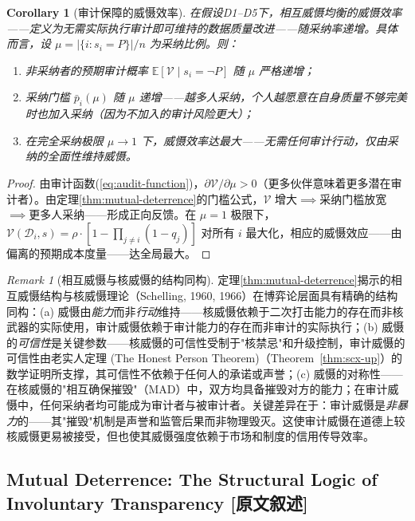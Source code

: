 \documentclass[12pt,a4paper]{ctexart}
\newtheorem{corollary}[theorem]{Corollary}
\theoremstyle{definition}
\theoremstyle{remark}
\newtheorem{remark}{Remark}[section]
\begin{document}
\begin{corollary}[审计保障的威慑效率]
\label{cor:deterrence-efficiency}
在假设D1--D5下，相互威慑均衡的威慑效率——定义为无需实际执行审计即可维持的数据质量改进——随采纳率递增。具体而言，设 $\mu = |\{i: s_i = P\}| / n$ 为采纳比例。则：
\begin{enumerate}[label=(\roman*)]
\item 非采纳者的预期审计概率 $\mathbb{E}[\mathcal{V} \mid s_i = \neg P]$ 随 $\mu$ 严格递增；
\item 采纳门槛 $\bar{p}_i(\mu)$ 随 $\mu$ 递增——越多人采纳，个人越愿意在自身质量不够完美时也加入采纳（因为不加入的审计风险更大）；
\item 在完全采纳极限 $\mu \to 1$ 下，威慑效率达最大——无需任何审计行动，仅由采纳的全面性维持威慑。
\end{enumerate}
\end{corollary}

\begin{proof}
由审计函数(\ref{eq:audit-function})，$\partial \mathcal{V} / \partial \mu > 0$（更多伙伴意味着更多潜在审计者）。由定理\ref{thm:mutual-deterrence}的门槛公式，$\mathcal{V}$ 增大$\implies$采纳门槛放宽$\implies$更多人采纳——形成正向反馈。在 $\mu = 1$ 极限下，$\mathcal{V}(\mathcal{D}_i, s) = \rho \cdot [1 - \prod_{j \neq i} (1 - q_j)]$ 对所有 $i$ 最大化，相应的威慑效应——由偏离的预期成本度量——达全局最大。
\end{proof}

\begin{remark}[相互威慑与核威慑的结构同构]
定理\ref{thm:mutual-deterrence}揭示的相互威慑结构与核威慑理论（Schelling, 1960, 1966）在博弈论层面具有精确的结构同构：(a) 威慑由\textit{能力}而非\textit{行动}维持——核威慑依赖于二次打击能力的存在而非核武器的实际使用，审计威慑依赖于审计能力的存在而非审计的实际执行；(b) 威慑的\textit{可信性}是关键参数——核威慑的可信性受制于"核禁忌"和升级控制，审计威慑的可信性由老实人定理 (The Honest Person Theorem)（Theorem~\ref{thm:scx-up}）的数学证明所支撑，其可信性不依赖于任何人的承诺或声誉；(c) 威慑的对称性——在核威慑的"相互确保摧毁"（MAD）中，双方均具备摧毁对方的能力；在审计威慑中，任何采纳者均可能成为审计者与被审计者。关键差异在于：审计威慑是\textit{非暴力}的——其"摧毁"机制是声誉和监管后果而非物理毁灭。这使审计威慑在道德上较核威慑更易被接受，但也使其威慑强度依赖于市场和制度的信用传导效率。
\end{remark}

\subsection{Mutual Deterrence: The Structural Logic of Involuntary Transparency [原文叙述]}
\end{document}
